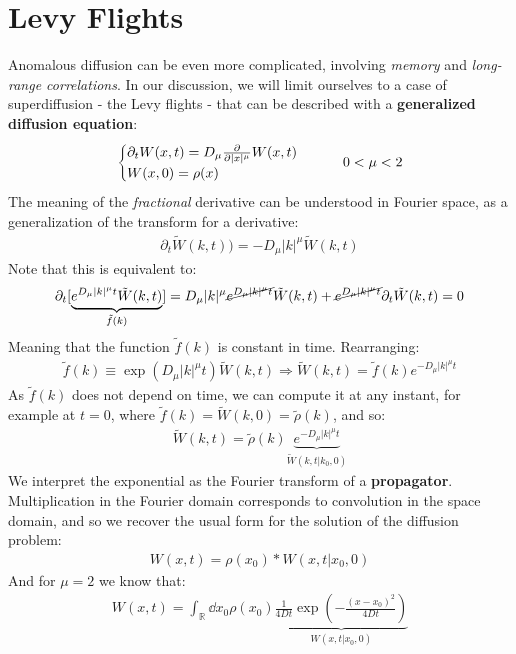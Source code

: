 \documentclass[../template.tex]{subfiles}
\begin{document}
\section{Levy Flights}
Anomalous diffusion can be even more complicated, involving \textit{memory} and \textit{long-range correlations}. In our discussion, we will limit ourselves to
 a case of superdiffusion - the Levy flights - that can be described with a \textbf{generalized diffusion equation}:
\begin{align*}
    \begin{cases}
        \partial_t W(x,t) = D_{\mu} \pdv{|x|^\mu} W(x,t)\\
        W(x,0) = \rho(x)
    \end{cases} \qquad 0 < \mu < 2
\end{align*} 
The meaning of the \textit{fractional} derivative can be understood in Fourier space, as a generalization of the transform for a derivative:
\begin{align*}
    \partial_t \tilde{W}(k,t) ) = - D_{\mu} |k|^\mu \tilde{W}(k,t)
\end{align*}  
Note that this is equivalent to:
\begin{align*}
    \partial_t[\underbrace{e^{D_\mu |k|^\mu t} \tilde{W}(k,t)}_{\tilde{f}(k)} ] = D_\mu |k|^\mu\cancel{ e^{D_\mu |k|^\mu t}} \tilde{W}(k,t) + \cancel{e^{D_\mu |k|^\mu t}} \partial_t \tilde{W}(k,t) = 0
\end{align*}
Meaning that the function $\tilde{f}(k)$ is constant in time. Rearranging:
\begin{align*}
    \tilde{f}(k) \equiv \exp\left(D_\mu |k|^\mu t\right) \tilde{W}(k,t) \Rightarrow \tilde{W}(k,t) = \tilde{f}(k) e^{-D_\mu |k|^\mu t}
\end{align*}
As $\tilde{f}(k)$ does not depend on time, we can compute it at any instant, for example at $t=0$, where $\tilde{f}(k) = \tilde{W}(k,0) = \tilde{\rho}(k)$, and so:
\begin{align*}
    \tilde{W}(k,t) = \tilde{\rho}(k) \underbrace{e^{-D_\mu |k|^\mu t}}_{\tilde{W}(k,t|k_0,0)} 
\end{align*}
We interpret the exponential as the Fourier transform of a \textbf{propagator}. Multiplication in the Fourier domain corresponds to convolution in the space domain, and so we recover the usual form for the solution of the diffusion problem:
\begin{align*}
W(x,t) = \rho(x_0) * W(x,t|x_0,0)    
\end{align*}
And for $\mu = 2$ we know that:
\begin{align*}
    W(x,t) = \int_{\mathbb{R}} \dd{x_0} \rho(x_0) \underbrace{\frac{1}{4 D t} \exp\left(-\frac{(x-x_0)^2}{4Dt} \right)}_{W(x,t|x_0,0)} 
\end{align*}
\end{document}
